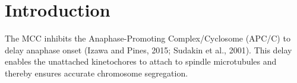 \chapter{Introduction}
\label{chpt:introduction}




The MCC inhibits the Anaphase-Promoting Complex/Cyclosome (APC/C) to delay anaphase onset (Izawa and Pines, 2015; Sudakin et al., 2001). This delay enables the unattached kinetochores to attach to spindle microtubules and thereby ensures accurate chromosome segregation.



